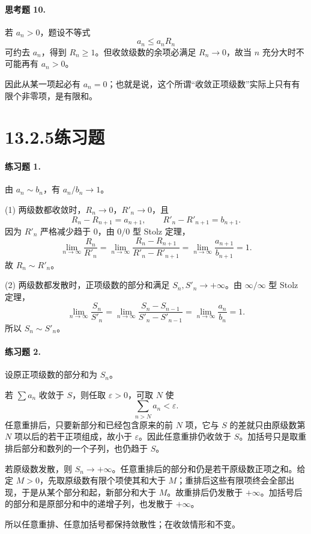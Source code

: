 \paragraph{思考题 10.}
\begin{xsolution}
若 $a_n>0$，题设不等式
\[
 a_n\leq a_nR_n
\]
可约去 $a_n$，得到 $R_n\geq1$。但收敛级数的余项必满足 $R_n\to0$，故当 $n$ 充分大时不可能再有 $a_n>0$。

因此从某一项起必有 $a_n=0$；也就是说，这个所谓“收敛正项级数”实际上只有有限个非零项，是有限和。
\end{xsolution}

\section*{13.2.5\quad 练习题}

\paragraph{练习题 1.}
\begin{xsolution}
由 $a_n\sim b_n$，有 $a_n/b_n\to1$。

(1) 两级数都收敛时，$R_n\to0$，$R'_n\to0$，且
\[
 R_n-R_{n+1}=a_{n+1},\qquad R'_n-R'_{n+1}=b_{n+1}.
\]
因为 $R'_n$ 严格减少趋于 $0$，由 $0/0$ 型 Stolz 定理，
\[
 \lim_{n\to\infty}\frac{R_n}{R'_n}
 =\lim_{n\to\infty}\frac{R_n-R_{n+1}}{R'_n-R'_{n+1}}
 =\lim_{n\to\infty}\frac{a_{n+1}}{b_{n+1}}=1.
\]
故 $R_n\sim R'_n$。

(2) 两级数都发散时，正项级数的部分和满足 $S_n,S'_n\to+\infty$。由 $\infty/\infty$ 型 Stolz 定理，
\[
 \lim_{n\to\infty}\frac{S_n}{S'_n}
 =\lim_{n\to\infty}\frac{S_n-S_{n-1}}{S'_n-S'_{n-1}}
 =\lim_{n\to\infty}\frac{a_n}{b_n}=1.
\]
所以 $S_n\sim S'_n$。
\end{xsolution}

\paragraph{练习题 2.}
\begin{xsolution}
设原正项级数的部分和为 $S_n$。

若 $\sum a_n$ 收敛于 $S$，则任取 $\varepsilon>0$，可取 $N$ 使
\[
 \sum_{n>N}a_n<\varepsilon.
\]
任意重排后，只要新部分和已经包含原来的前 $N$ 项，它与 $S$ 的差就只由原级数第 $N$ 项以后的若干正项组成，故小于 $\varepsilon$。因此任意重排仍收敛于 $S$。加括号只是取重排后部分和数列的一个子列，也仍趋于 $S$。

若原级数发散，则 $S_n\to+\infty$。任意重排后的部分和仍是若干原级数正项之和。给定 $M>0$，先取原级数有限个项使其和大于 $M$；重排后这些有限项终会全部出现，于是从某个部分和起，新部分和大于 $M$。故重排后仍发散于 $+\infty$。加括号后的部分和是原部分和中的递增子列，也发散于 $+\infty$。

所以任意重排、任意加括号都保持敛散性；在收敛情形和不变。
\end{xsolution}

